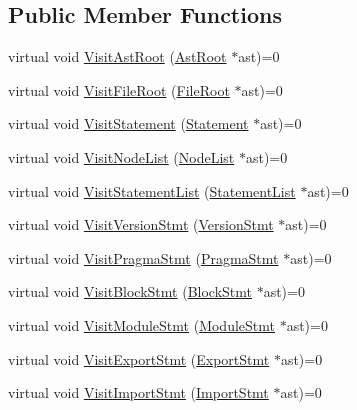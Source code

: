 \subsection*{Public Member Functions}
\begin{DoxyCompactItemize}
\item 
virtual void \hyperlink{classmocha_1_1_i_visitor_a14807229b38c495d43044c03333572e2}{VisitAstRoot} (\hyperlink{classmocha_1_1_ast_root}{AstRoot} $\ast$ast)=0
\item 
virtual void \hyperlink{classmocha_1_1_i_visitor_a85dacad749436d2837cf92dde6f8fb6b}{VisitFileRoot} (\hyperlink{classmocha_1_1_file_root}{FileRoot} $\ast$ast)=0
\item 
virtual void \hyperlink{classmocha_1_1_i_visitor_ae831110aa82bae2c6a147841e6adfd13}{VisitStatement} (\hyperlink{classmocha_1_1_statement}{Statement} $\ast$ast)=0
\item 
virtual void \hyperlink{classmocha_1_1_i_visitor_a489f3caa682a0913cba6d6dcca5fcd3a}{VisitNodeList} (\hyperlink{classmocha_1_1_node_list}{NodeList} $\ast$ast)=0
\item 
virtual void \hyperlink{classmocha_1_1_i_visitor_a39e45994c34885d31b7446f9c5e36a99}{VisitStatementList} (\hyperlink{classmocha_1_1_statement_list}{StatementList} $\ast$ast)=0
\item 
virtual void \hyperlink{classmocha_1_1_i_visitor_a821b8ff3e61422312bb5a866e70af501}{VisitVersionStmt} (\hyperlink{classmocha_1_1_version_stmt}{VersionStmt} $\ast$ast)=0
\item 
virtual void \hyperlink{classmocha_1_1_i_visitor_a0ee4f610a15866a72e65fb9097d3da25}{VisitPragmaStmt} (\hyperlink{classmocha_1_1_pragma_stmt}{PragmaStmt} $\ast$ast)=0
\item 
virtual void \hyperlink{classmocha_1_1_i_visitor_aff6d32d4c6fb0b43a5a606aadd6ca928}{VisitBlockStmt} (\hyperlink{classmocha_1_1_block_stmt}{BlockStmt} $\ast$ast)=0
\item 
virtual void \hyperlink{classmocha_1_1_i_visitor_af8ba88d274a5fc58ce40559825a612e9}{VisitModuleStmt} (\hyperlink{classmocha_1_1_module_stmt}{ModuleStmt} $\ast$ast)=0
\item 
virtual void \hyperlink{classmocha_1_1_i_visitor_ac7fbecfec4f0d893061c28ec55191d64}{VisitExportStmt} (\hyperlink{classmocha_1_1_export_stmt}{ExportStmt} $\ast$ast)=0
\item 
virtual void \hyperlink{classmocha_1_1_i_visitor_a9572cf91a1caa867c77ad0c82de35357}{VisitImportStmt} (\hyperlink{classmocha_1_1_import_stmt}{ImportStmt} $\ast$ast)=0
\item 

\end{DoxyCompactItemize}
